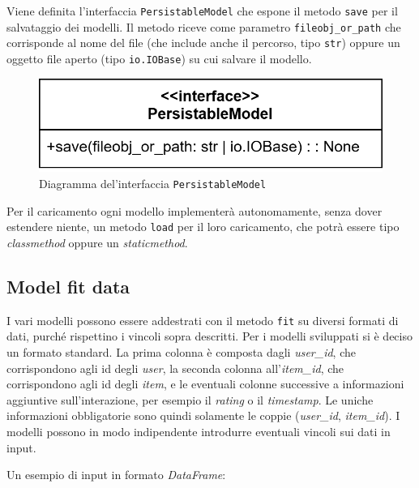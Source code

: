 Viene definita l'interfaccia \texttt{PersistableModel} che espone il metodo \texttt{save} per il salvataggio dei modelli. Il metodo riceve come parametro \texttt{fileobj\_or\_path} che corrisponde al nome del file (che include anche il percorso, tipo \texttt{str}) oppure un oggetto file aperto (tipo \texttt{io.IOBase}) su cui salvare il modello.

\begin{figure}[H]
    \centering
    \includegraphics[scale=0.3]{figures/UML/models/persistable_model.png}
    \caption{Diagramma del'interfaccia \texttt{PersistableModel}}
\end{figure}

Per il caricamento ogni modello implementerà autonomamente, senza dover estendere niente, un metodo \texttt{load} per il loro caricamento, che potrà essere tipo \textit{classmethod} oppure un \textit{staticmethod}.

\subsection{Model fit data}\label{model_fit_data}

I vari modelli possono essere addestrati con il metodo \texttt{fit} su diversi formati di dati, purché rispettino i vincoli sopra descritti. Per i modelli sviluppati si è deciso un formato standard. La prima colonna è composta dagli \textit{user\_id}, che corrispondono agli id degli \textit{user}, la seconda colonna all'\textit{item\_id}, che corrispondono agli id degli \textit{item}, e le eventuali colonne successive a informazioni aggiuntive sull'interazione, per esempio il \textit{rating} o il \textit{timestamp}. Le uniche informazioni obbligatorie sono quindi solamente le coppie (\textit{user\_id}, \textit{item\_id}). I modelli possono in modo indipendente introdurre eventuali vincoli sui dati in input.

Un esempio di input in formato \textit{DataFrame}:

